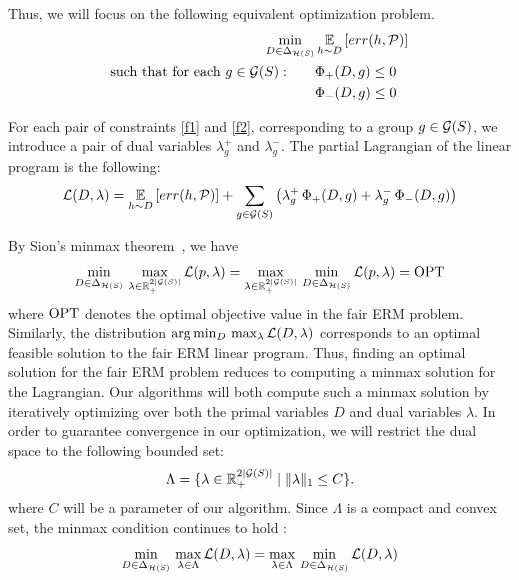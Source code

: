 Thus, we
will focus on the following equivalent optimization problem.
\begin{align}
    \min_{D\in \Delta_{\mathcal{H}(S)}}& \operatorname*{\mathbb{E}}_{h\sim D}\left[err(h, \mathcal{P})\right]   \\
\mbox{such that for each }  g\in \mathcal{G}(S):\qquad
  & \Phi_+(D, g)\leq 0 \label{f1}\\
  & \Phi_-(D,g) \leq 0 \label{f2}
\end{align}

For each pair of constraints \eqref{f1} and \eqref{f2}, corresponding
to a group $g\in \mathcal{G}(S)$, we introduce a pair of dual variables
$\lambda_g^+$ and $\lambda_g^-$. The partial Lagrangian of the linear
program is the following:
\begin{align*}
  \mathcal{L}(D, \lambda) = \operatorname*{\mathbb{E}}_{h\sim D}\left[err(h, \mathcal{P})\right] +  \sum_{g\in \mathcal{G}(S)}
  \left( \lambda_g^+\,  \Phi_+(D, g) +  \lambda_g^- \,  \Phi_-(D,g) \right)
\end{align*}

By Sion's minmax theorem~\citep{sion1958}, we have
\[
  \min_{D\in \Delta_{\mathcal{H}(S)}}\, \max_{\lambda\in \mathbb{R}_+^{2|\mathcal{G}(S)|}} \mathcal{L}(p,
  \lambda) = \max_{\lambda\in \mathbb{R}_+^{2|\mathcal{G}(S)|}}\, \min_{D\in
    \Delta_{\mathcal{H}(S)}} \mathcal{L}(p, \lambda) = \operatorname{OPT}
\]
where $\operatorname{OPT}$ denotes the optimal objective value in the fair ERM
problem. Similarly, the distribution
$\arg\min_{D}\, \max_{\lambda} \mathcal{L}(D, \lambda)$ corresponds to an
optimal feasible solution to the fair ERM linear program.  Thus,
finding an optimal solution for the fair ERM problem reduces to
computing a minmax solution for the Lagrangian. Our algorithms will
both compute such a minmax solution by iteratively optimizing over
both the primal variables $D$ and dual variables $\lambda$. In order
to guarantee convergence in our optimization, we will restrict the
dual space to the following bounded set:
\[
  \Lambda = \{\lambda \in \mathbb{R}_+^{2|\mathcal{G}(S)|} \mid \|\lambda\|_1 \leq
  C\}.
\]
where $C$ will be a parameter of our algorithm. Since $\Lambda$ is a compact
and convex set, the minmax condition continues to hold \citep{sion1958}:
\begin{equation}
  \min_{D\in \Delta_{\mathcal{H}(S)}}\, \max_{\lambda\in \Lambda} \mathcal{L}(D,
  \lambda) = \max_{\lambda\in \Lambda}\, \min_{D\in \Delta_{\mathcal{H}(S)}}
  \mathcal{L}(D, \lambda) \label{minmax}
\end{equation}

